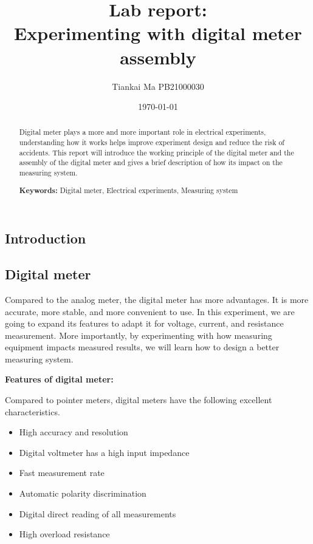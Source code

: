 \documentclass[a4paper]{article}
\title{Lab report:\\Experimenting with digital meter assembly}
\author{Tiankai Ma PB21000030}
\date{\today}
\begin{document}
\begin{multicols*}{2}
    \maketitle
    \begin{abstract}
        Digital meter plays a more and more important role in electrical experiments, understanding how it works helps improve experiment design and reduce the risk of accidents. This report will introduce the working principle of the digital meter and the assembly of the digital meter and gives a brief description of how its impact on the measuring system.
        \par
        \textbf{Keywords:} Digital meter, Electrical experiments, Measuring system
    \end{abstract}
    \section*{Introduction}

    \subsection*{Digital meter}

    Compared to the analog meter, the digital meter has more advantages. It is more accurate, more stable, and more convenient to use. In this experiment, we are going to expand its features to adapt it for voltage, current, and resistance measurement. More importantly, by experimenting with how measuring equipment impacts measured results, we will learn how to design a better measuring system.

    \textbf{Features of digital meter:}

    Compared to pointer meters, digital meters have the following excellent characteristics.

    \begin{itemize}
        \item High accuracy and resolution
        \item Digital voltmeter has a high input impedance
        \item Fast measurement rate
        \item Automatic polarity discrimination
        \item Digital direct reading of all measurements
        \item High overload resistance
    \end{itemize}


\end{multicols*}
\end{document}
